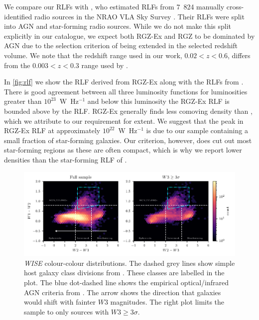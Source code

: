   We compare our RLFs with \citet{mauch07rlf}, who estimated RLFs from 7~824
  manually cross-identified radio sources in the NRAO VLA Sky Survey \citep[NVSS;][]{condon98nvss}.
  Their RLFs were split into AGN and star-forming radio sources. While we
  do not make this split explicitly in our catalogue, we expect both RGZ-Ex
  and RGZ to be dominated by AGN due to the selection criterion of being extended in the selected redshift volume. We note that the redshift range used in our work, $0.02 < z < 0.6$, differs from the $0.003 < z < 0.3$ range used by \citet{mauch07rlf}.

  In \autoref{fig:rlf} we show the RLF derived from RGZ-Ex along with the RLFs from \citet{mauch07rlf}. There is good
  agreement between all three luminosity functions for luminosities greater than $10^{23}$~W~Hz$^{-1}$
  and below this luminosity the RGZ-Ex RLF is bounded above by the
  \citet{mauch07rlf} RLF. RGZ-Ex generally finds less comoving density than \citet{mauch07rlf}, which we attribute to our requirement for extent. We suggest that the peak in RGZ-Ex RLF at approximately $10^{22}$~W~Hz$^{-1}$ is due to our sample containing a small fraction of star-forming galaxies. Our criterion, however, does cut out most star-forming regions as these are often compact, which is why we report lower densities than the star-forming RLF of \citet{mauch07rlf}.

\begin{figure}
    \centering
    \includegraphics{rlf-images/colour-colour.pdf}
    \caption{\emph{WISE} colour-colour distributions. The dashed grey lines show
      simple host galaxy class divisions from \citet{jarrett17wise}. These
      classes are labelled in the plot. The blue dot-dashed line shows
      the empirical optical/infrared AGN criteria from \citet{jarrett11wise}. The arrow shows the direction that galaxies would shift with fainter $W3$ magnitudes. The right plot limits the sample to only sources with $W3 \geq 3 \sigma$.
      \label{fig:colour-colour}}
  \end{figure}

